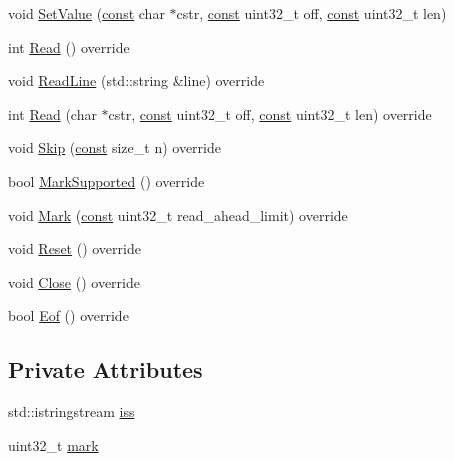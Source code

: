 \begin{DoxyCompactItemize}
\item 
void \mbox{\hyperlink{classlucene_1_1core_1_1analysis_1_1StringReader_ac09c0dcf47934c6239845881b35c5aba}{Set\+Value}} (\mbox{\hyperlink{ZlibCrc32_8h_a2c212835823e3c54a8ab6d95c652660e}{const}} char $\ast$cstr, \mbox{\hyperlink{ZlibCrc32_8h_a2c212835823e3c54a8ab6d95c652660e}{const}} uint32\+\_\+t off, \mbox{\hyperlink{ZlibCrc32_8h_a2c212835823e3c54a8ab6d95c652660e}{const}} uint32\+\_\+t len)
\item 
int \mbox{\hyperlink{classlucene_1_1core_1_1analysis_1_1StringReader_ac9c1bb033ee4f5862e47e90c422d3381}{Read}} () override
\item 
void \mbox{\hyperlink{classlucene_1_1core_1_1analysis_1_1StringReader_a5bf198e593389f1255ec7a4f69f3187d}{Read\+Line}} (std\+::string \&line) override
\item 
int \mbox{\hyperlink{classlucene_1_1core_1_1analysis_1_1StringReader_ab048d6d6d759175eeda5321a480995c3}{Read}} (char $\ast$cstr, \mbox{\hyperlink{ZlibCrc32_8h_a2c212835823e3c54a8ab6d95c652660e}{const}} uint32\+\_\+t off, \mbox{\hyperlink{ZlibCrc32_8h_a2c212835823e3c54a8ab6d95c652660e}{const}} uint32\+\_\+t len) override
\item 
void \mbox{\hyperlink{classlucene_1_1core_1_1analysis_1_1StringReader_a745fa855b7308d2c08e289751590cdc7}{Skip}} (\mbox{\hyperlink{ZlibCrc32_8h_a2c212835823e3c54a8ab6d95c652660e}{const}} size\+\_\+t n) override
\item 
bool \mbox{\hyperlink{classlucene_1_1core_1_1analysis_1_1StringReader_a1b9e55036f01d10650fd4026f23da629}{Mark\+Supported}} () override
\item 
void \mbox{\hyperlink{classlucene_1_1core_1_1analysis_1_1StringReader_a0ba42881881e4790dae54bc1c01063f5}{Mark}} (\mbox{\hyperlink{ZlibCrc32_8h_a2c212835823e3c54a8ab6d95c652660e}{const}} uint32\+\_\+t read\+\_\+ahead\+\_\+limit) override
\item 
void \mbox{\hyperlink{classlucene_1_1core_1_1analysis_1_1StringReader_ab68ad2d8d2e375cd063c374c570fcffa}{Reset}} () override
\item 
void \mbox{\hyperlink{classlucene_1_1core_1_1analysis_1_1StringReader_ac2938d531e7842abb8423149982328e3}{Close}} () override
\item 
bool \mbox{\hyperlink{classlucene_1_1core_1_1analysis_1_1StringReader_a7697e462ff19e3e8fa135e38fa3e4999}{Eof}} () override
\end{DoxyCompactItemize}
\subsection*{Private Attributes}
\begin{DoxyCompactItemize}
\item 
std\+::istringstream \mbox{\hyperlink{classlucene_1_1core_1_1analysis_1_1StringReader_ada023622e5d849d9fe8e9fcb838af328}{iss}}
\item 
uint32\+\_\+t \mbox{\hyperlink{classlucene_1_1core_1_1analysis_1_1StringReader_a9a5cc9672f77bed7c252145fbde69176}{mark}}
\end{DoxyCompactItemize}


